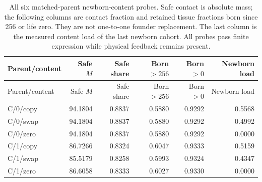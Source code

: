 \begin{longtable}{lrrrrr}
\caption{All six matched-parent newborn-content probes. Safe contact is absolute mass; the following columns are contact fraction and retained tissue fractions born since 256 or life zero. They are not one-to-one founder replacement. The last column is the measured content load of the last newborn cohort. All probes pass finite expression while physical feedback remains present.}\label{tab:young-payload}\\
\toprule
Parent/content & Safe $M$ & Safe share & Born $>256$ & Born $>0$ & Newborn load \\
\midrule\endfirsthead
\toprule
Parent/content & Safe $M$ & Safe share & Born $>256$ & Born $>0$ & Newborn load \\
\midrule\endhead
C/0/copy & 94.1804 & 0.8837 & 0.5880 & 0.9292 & 0.5568 \\
C/0/swap & 94.1804 & 0.8837 & 0.5880 & 0.9292 & 0.4992 \\
C/0/zero & 94.1804 & 0.8837 & 0.5880 & 0.9292 & 0.0000 \\
C/1/copy & 86.7266 & 0.8324 & 0.6047 & 0.9333 & 0.5159 \\
C/1/swap & 85.5179 & 0.8258 & 0.5993 & 0.9324 & 0.4347 \\
C/1/zero & 86.6058 & 0.8333 & 0.6027 & 0.9330 & 0.0000 \\
\bottomrule
\end{longtable}
